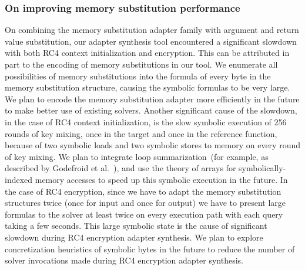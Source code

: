\subsubsection{On improving memory substitution performance} On
combining the memory substitution adapter family with argument and
return value substitution, our adapter synthesis tool encountered a
significant slowdown with both RC4 context initialization and encryption.
%
This can be attributed in part to the encoding of memory substitutions in our tool.
%
We enumerate all possibilities of memory substitutions into the formula of every byte in the memory substitution structure, causing the symbolic formulas to be very large.
%
We plan to encode the memory substitution adapter more efficiently in the future to make better use of existing solvers.
%
Another significant cause of the slowdown, in the case of RC4 context initialization, is the slow symbolic execution of 256 rounds of key mixing, once in the target and once in the reference function, because of two symbolic loads and two symbolic stores to memory on every round of key mixing.
%
We plan to integrate loop summarization~(for example, as described by
Godefroid et al.~\cite{godefroid2011}), and use the theory of arrays for symbolically-indexed memory accesses to speed up this symbolic execution in the future.
%
In the case of RC4 encryption, since we have to adapt the memory substitution structures twice (once for input and once for output) we have to present large formulas to the solver at least twice on every execution path with each query taking a few seconds.
%
This large symbolic state is the cause of significant slowdown during RC4 encryption adapter synthesis.
%
We plan to explore concretization heuristics of symbolic bytes in the future to reduce the number of solver invocations made during RC4 encryption adapter synthesis.
%
\noindent
